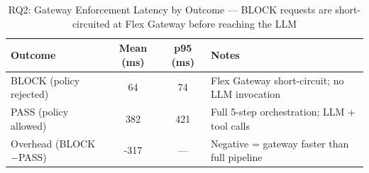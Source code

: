 \begin{table}[t]
        \centering
        \caption{RQ2: Gateway Enforcement Latency by Outcome — BLOCK requests are short-circuited at Flex Gateway before reaching the LLM}
        \label{tab:rq2_latency}
        \begin{tabular}{lccp{4.5cm}}
        \hline
        \textbf{Outcome} & \textbf{Mean (ms)} & \textbf{p95 (ms)} & \textbf{Notes} \\
\hline
        BLOCK (policy rejected) & 64 & 74 & Flex Gateway short-circuit; no LLM invocation \\
PASS (policy allowed) & 382 & 421 & Full 5-step orchestration; LLM + tool calls \\
Overhead (BLOCK$-$PASS) & -317 & — & Negative = gateway faster than full pipeline \\
        \hline
        \end{tabular}
        \end{table}
